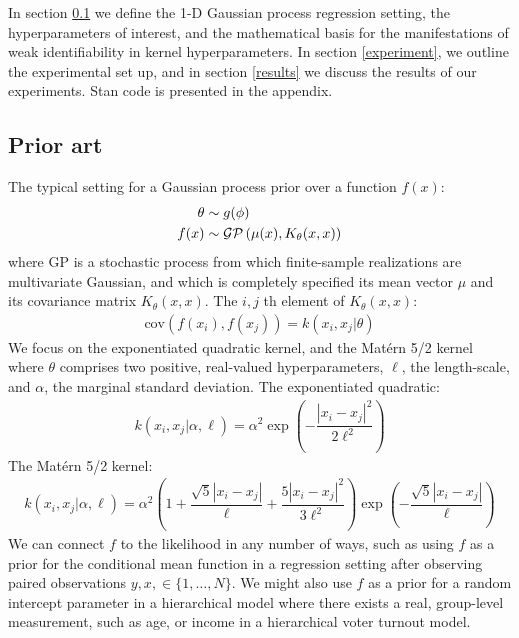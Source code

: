 \documentclass{article}
\newcommand{\lp}{\ensuremath{\left(}}
\newcommand{\rp}{\ensuremath{\right)}}
\begin{document}
In section \ref{prior_art} we define the 1-D Gaussian process regression setting,
the hyperparameters of interest, and the mathematical basis for the manifestations
of weak identifiability in kernel hyperparameters. In section \ref{experiment}, we 
outline the experimental set up, and in section \ref{results} we discuss the results 
of our experiments. Stan code is presented in the appendix.

\subsection{Prior art} \label{prior_art}

The typical setting for a Gaussian process prior over a function $f(x)$:
%
\begin{align*}
  \theta & \sim g(\phi) \\
  f(x) & \sim \mathcal{GP}\lp \mu(x),
  K_\theta(x, x) \rp 
\end{align*}
%
where $\text{GP}$ is a stochastic process from which finite-sample realizations are
multivariate Gaussian, and which is completely specified its mean vector $\mu$
and its covariance matrix $K_\theta(x, x)$. The $i, j$ th
element of $K_\theta(x, x)$:
\begin{align*}
  \text{cov}(f(x_i), f(x_j)) = k(x_i, x_j | \theta) 
\end{align*}
We focus on the exponentiated quadratic kernel, and the Mat\'{e}rn 5/2 kernel
where $\theta$ comprises two positive, real-valued hyperparameters, $\ell$, the
length-scale, and $\alpha$, the marginal standard deviation.  The exponentiated
quadratic:
\begin{align} \label{kern_quad}
  k(x_i, x_j | \alpha, \ell) = \alpha^2 
\exp \left(
	- \dfrac{|x_{i} - x_{j}|^2}{2\ell^2}
\right)
\end{align}
%
The Mat\'{e}rn 5/2 kernel:
%
\begin{align} \label{kern_quad}
  k(x_i, x_j | \alpha, \ell) = \alpha^2 
	\left( 
	1 + \dfrac{\sqrt{5} |x_{i} - x_{j}|}{\ell} + \dfrac{5|x_{i} - x_{j}|^2}{3\ell^2}
	\right)
	\exp \left(
	- \dfrac{\sqrt{5}{|x_{i} - x_{j}|}}{\ell} 
\right)
\end{align}
We can connect $f$ to the likelihood in any number of ways, such as using $f$
as a prior for the conditional mean function in a regression setting after
observing paired observations $y, x, \in \{1,\dots,N\}$. We might also use $f$
as a prior for a random intercept parameter in a hierarchical model where there
exists a real, group-level measurement, such as age, or income in a
hierarchical voter turnout model.
\end{document}
